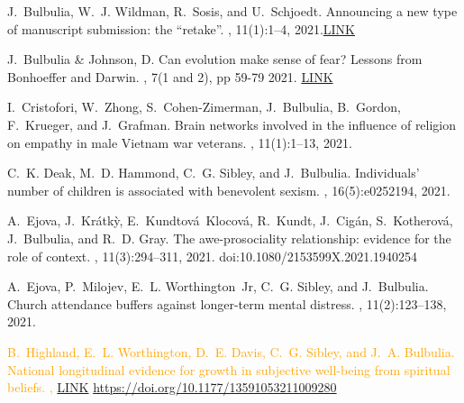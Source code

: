 \documentclass{article}
\begin{document}
\begin{thebibliography}{99}
J.~Bulbulia, W.~J. Wildman, R.~Sosis, and U.~Schjoedt.
\newblock Announcing a new type of manuscript submission: the ``retake''.
, 11(1):1--4, 2021.\href{https://www.tandfonline.com/doi/full/10.1080/2153599X.2021.1876333}{LINK}



J.~Bulbulia \& Johnson, D.
\newblock Can evolution make sense of fear? Lessons from Bonhoeffer and Darwin.
, 7(1 and 2), pp 59-79
  2021. \href{/Users/jbul176/The Virtues Project Dropbox/Joseph Bulbulia/00Bulbulia Pubs/2021/2021_DOM_BONHOFFER/Joseph-Bulbulia-and-Dominic-DP-Johnson-i8wdhc_5610_1629099188.pdf}{LINK}


I.~Cristofori, W.~Zhong, S.~Cohen-Zimerman, J.~Bulbulia, B.~Gordon, F.~Krueger,
  and J.~Grafman.
\newblock Brain networks involved in the influence of religion on empathy in
  male Vietnam war veterans.
, 11(1):1--13, 2021.




C.~K. Deak, M.~D. Hammond, C.~G. Sibley, and J.~Bulbulia.
\newblock Individuals' number of children is associated with benevolent sexism.
, 16(5):e0252194, 2021.



A.~Ejova, J.~Kr{\'a}tk{\`y}, E.~Kundtov{\'a}~Klocov{\'a}, R.~Kundt,
  J.~Cig{\'a}n, S.~Kotherov{\'a}, J.~Bulbulia, and R.~D. Gray.
\newblock The awe-prosociality relationship: evidence for the role of context.
, 11(3):294--311, 2021. 
\newblock doi:10.1080/2153599X.2021.1940254

A.~Ejova, P.~Milojev, E.~L. Worthington~Jr, C.~G. Sibley, and J.~Bulbulia.
\newblock Church attendance buffers against longer-term mental distress.
, 11(2):123--138, 2021.



\textcolor{Orange}{B.~Highland, E.~L. Worthington, D.~E. Davis, C.~G. Sibley, and J.~A. Bulbulia.
\newblock National longitudinal evidence for growth in subjective well-being
  from spiritual beliefs.
, \href{https://www.dropbox.com/s/zkzw3x82kqirwyc/13591053211009280.pdf?dl=0}{LINK}
\newblock \href{https://doi.org/10.1177/13591053211009280}{https://doi.org/10.1177/13591053211009280} }


\end{thebibliography}
\end{document}
